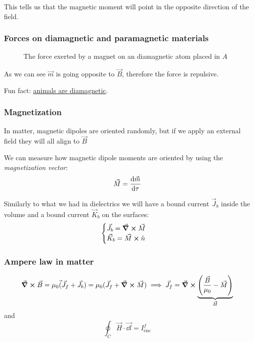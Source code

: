 \documentclass[12pt]{extarticle}
\begin{document}
This tells us that the magnetic moment will point in the opposite direction of the field.

\subsubsection{Forces on diamagnetic and paramagnetic materials}

\begin{figure}[H]
    \centering
    
    \caption{The force exerted by a magnet on an diamagnetic atom placed in $A$}
\end{figure}

As we can see $\vec m$ is going opposite to $\vec B$, therefore the force is repulsive.

Fun fact: \href{https://www.youtube.com/watch?v=KlJsVqc0ywM}{animals are diamagnetic}.

\subsubsection{Magnetization}

In matter, magnetic dipoles are oriented randomly,
but if we apply an external field they will all align to $\vec B$

We can measure how magnetic dipole moments are oriented by using the \emph{magnetization vector}:
\begin{equation}
    \vec M = \dv{\vec m}{\tau}
\end{equation}

Similarly to what we had in dielectrics we will have a bound current $\vec J_b$ inside the volume
and a bound current $\vec K_b$ on the surfaces:
\begin{equation}
    \begin{cases}
        \vec J_b = \curl \vec M \\
        \vec K_b = \vec M \cross \hat n
    \end{cases}
\end{equation}

\subsubsection{Ampere law in matter}
\begin{equation}
    \curl \vec B = \mu_0 \vec (\vec J_f + \vec J_b) = \mu_0 (\vec J_f + \curl \vec M)
    \implies \vec J_f = \curl \underbrace{\left( \frac{\vec B}{\mu_0} - \vec M \right)}_{\vec H}
\end{equation}
and
\begin{equation}
    \oint_C \vec H \cdot \vec{\dd l} = I^f_\text{enc}
\end{equation}
\end{document}
